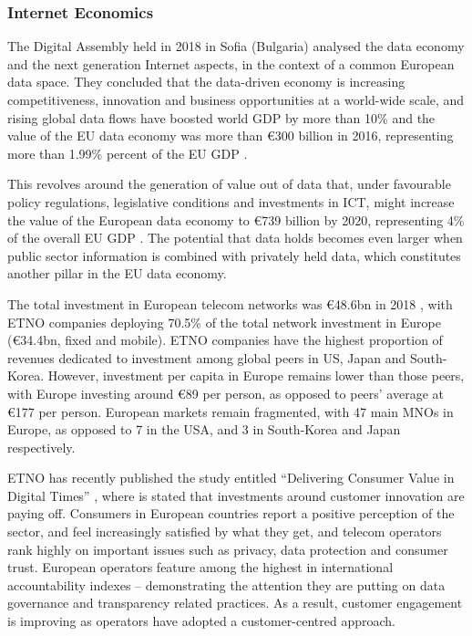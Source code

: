 \documentclass[journal]{IEEEtran}
\begin{document}
\subsubsection{Internet Economics}
The Digital Assembly held in 2018 in Sofia (Bulgaria) \cite{DA_DE} analysed the data economy and the next generation Internet aspects, in the context of a common European data space. They concluded that the data-driven economy is increasing competitiveness, innovation and business opportunities at a world-wide scale, and rising global data flows have boosted world GDP by more than 10\% \cite{MGI_AA} and the value of the EU data economy was more than \euro{300} billion in 2016, representing more than 1.99\% percent of the EU GDP \cite{IDC_EDM} \cite{IDC_PD}.

This revolves around the generation of value out of data that, under favourable policy regulations, legislative conditions and investments in ICT, might increase the value of the European data economy to \euro{739} billion by 2020, representing 4\% of the overall EU GDP \cite{EC_EDS}. The potential that data holds becomes even larger when public sector information is combined with privately held data, which constitutes another pillar in the EU data economy.

The total investment in European telecom networks was \euro{48.6}bn in 2018 \cite{ETNO_SDC}, with ETNO companies deploying 70.5\% of the total network investment in Europe (\euro{34.4}bn, fixed and mobile). ETNO companies have the highest proportion of revenues dedicated to investment among global peers in US, Japan and South-Korea. However, investment per capita in Europe remains lower than those peers, with Europe investing around \euro{89} per person, as opposed to peers’ average at \euro{177} per person. European markets remain fragmented, with 47 main MNOs in Europe, as opposed to 7 in the USA, and 3 in South-Korea and Japan respectively.

ETNO has recently published the study entitled \enquote{Delivering Consumer Value in Digital Times} \cite{ETNO_DCV}, where is stated that investments around customer innovation are paying off. Consumers in European countries report a positive perception of the sector, and feel increasingly satisfied by what they get, and telecom operators rank highly on important issues such as privacy, data protection and consumer trust. European operators feature among the highest in international accountability indexes – demonstrating the attention they are putting on data governance and transparency related practices. As a result, customer engagement is improving as operators have adopted a customer-centred approach.
\end{document}

